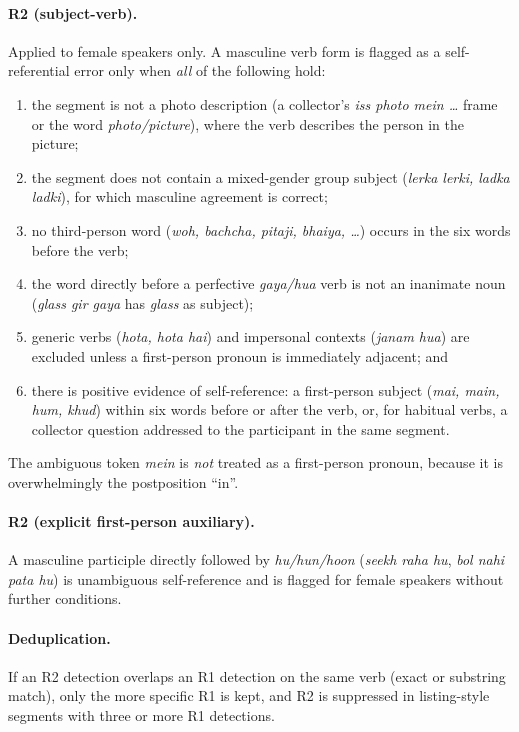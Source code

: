 \documentclass[11pt,a4paper]{report}
\begin{document}
\paragraph{R2 (subject-verb).}\label{sec:r2} Applied to female speakers only. A masculine verb form is flagged as a self-referential error only when \emph{all} of the following hold:
\begin{enumerate}
  \item the segment is not a photo description (a collector's \textit{iss photo mein \ldots} frame or the word \textit{photo/picture}), where the verb describes the person in the picture;
  \item the segment does not contain a mixed-gender group subject (\textit{lerka lerki, ladka ladki}), for which masculine agreement is correct;
  \item no third-person word (\textit{woh, bachcha, pitaji, bhaiya, \ldots}) occurs in the six words before the verb;
  \item the word directly before a perfective \textit{gaya/hua} verb is not an inanimate noun (\textit{glass gir gaya} has \textit{glass} as subject);
  \item generic verbs (\textit{hota, hota hai}) and impersonal contexts (\textit{janam hua}) are excluded unless a first-person pronoun is immediately adjacent; and
  \item there is positive evidence of self-reference: a first-person subject (\textit{mai, main, hum, khud}) within six words before or after the verb, or, for habitual verbs, a collector question addressed to the participant in the same segment.
\end{enumerate}
The ambiguous token \textit{mein} is \emph{not} treated as a first-person pronoun, because it is overwhelmingly the postposition ``in''.

\paragraph{R2 (explicit first-person auxiliary).} A masculine participle directly followed by \textit{hu/hun/hoon} (\textit{seekh raha hu}, \textit{bol nahi pata hu}) is unambiguous self-reference and is flagged for female speakers without further conditions.

\paragraph{Deduplication.} If an R2 detection overlaps an R1 detection on the same verb (exact or substring match), only the more specific R1 is kept, and R2 is suppressed in listing-style segments with three or more R1 detections.
\end{document}
